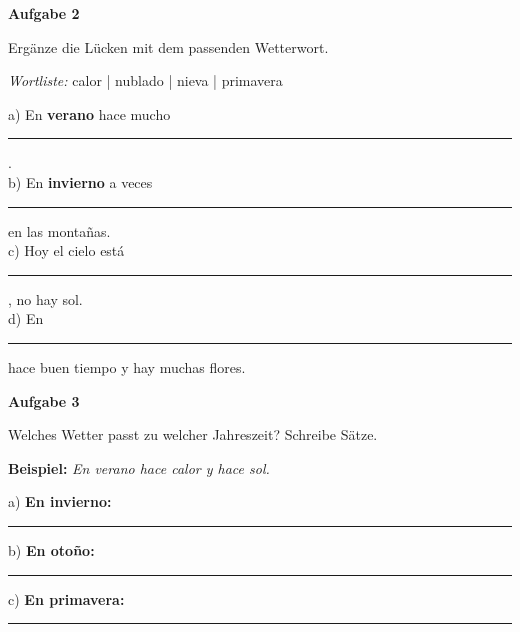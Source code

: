 \documentclass[11pt, a4paper]{article}
\newcommand{\fachfarbe}{spanisch}
\newcommand{\punktebox}[1]{\hfill\fbox{\small \_/#1}}
\newcommand{\luecke}[1]{\rule{#1}{0.4pt}}
\newenvironment{aufgabe}[1]{%
    \needspace{5\baselineskip}%
    \nopagebreak[4]%
    \vspace{10pt}
    \noindent\textbf{\textcolor{\fachfarbe}{Aufgabe #1}}
    \nopagebreak[4]%
    \vspace{5pt}
    \nopagebreak[4]%
    \begin{list}{}{\leftmargin=0pt}
    \item[]
}{%
    \end{list}
}
\newcommand{\es}[1]{\textcolor{\fachfarbe}{\textbf{#1}}}
\begin{document}
\begin{aufgabe}{2}
Ergänze die Lücken mit dem passenden Wetterwort. \punktebox{4}
\end{aufgabe}

\begin{vokabelkasten}
\textit{Wortliste:} calor | nublado | nieva | primavera
\end{vokabelkasten}

\vspace{0.5em}

\noindent
a) En \es{verano} hace mucho \luecke{3cm}. \\[0.8em]
b) En \es{invierno} a veces \luecke{3cm} en las montañas. \\[0.8em]
c) Hoy el cielo está \luecke{3cm}, no hay sol. \\[0.8em]
d) En \luecke{3cm} hace buen tiempo y hay muchas flores. \\

\vspace{15pt}


\begin{aufgabe}{3}
Welches Wetter passt zu welcher Jahreszeit? Schreibe Sätze. \punktebox{4}
\end{aufgabe}

\noindent
\textbf{Beispiel:} \textit{En verano hace calor y hace sol.}

\vspace{0.5em}

\noindent
a) \textbf{En invierno:}

\luecke{\textwidth}

\vspace{0.8em}

b) \textbf{En otoño:}

\luecke{\textwidth}

\vspace{0.8em}

c) \textbf{En primavera:}

\luecke{\textwidth}

\vspace{15pt}

\end{document}
